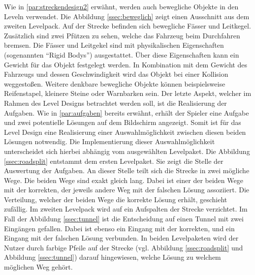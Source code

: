 		Wie in \ref{par:streckendesign2} erwähnt, werden auch bewegliche Objekte in den Leveln verwendet. Die Abbildung \ref{ssec:beweglich} zeigt einen Ausschnitt aus dem zweiten Levelpack. Auf der Strecke befinden sich bewegliche Fässer und Leitkegel. Zusätzlich sind zwei Pfützen zu sehen, welche das Fahrzeug beim Durchfahren bremsen. Die Fässer und Leitgekel sind mit physikalischen Eigenschaften (sogenannten \enquote{Rigid Bodys}) ausgestattet. Über diese Eigenschaften kann ein Gewicht für das Objekt festgelegt werden. In Kombination mit dem Gewicht des Fahrzeugs und dessen Geschwindigkeit wird das Objekt bei einer Kollision weggestoßen. Weitere denkbare bewegliche Objekte können beispielsweise Reifenstapel, kleinere Steine oder Warnbarken sein.
		Der letzte Aspekt, welcher im Rahmen des Level Designs betrachtet werden soll, ist die Realisierung der Aufgaben. Wie in \ref{par:aufgaben} bereits erwähnt, erhält der Spieler eine Aufgabe und zwei potentielle Lösungen auf dem Bildschirm angezeigt. Somit ist für das Level Design eine Realisierung einer Auswahlmöglichkeit zwischen diesen beiden Lösungen notwendig. Die Implementierung dieser Auswahlmöglichkeit unterscheidet sich hierbei abhängig vom ausgewählten Levelpaket.
		Die Abbildung \ref{ssec:roadsplit} entstammt dem ersten Levelpaket. Sie zeigt die Stelle der Auswertung der Aufgaben. An dieser Stelle teilt sich die Strecke in zwei mögliche Wege. Die beiden Wege sind exakt gleich lang. Dabei ist einer der beiden Wege mit der korrekten, der jeweils andere Weg mit der falschen Lösung assoziiert. Die Verteilung, welcher der beiden Wege die korrekte Lösung erhält, geschieht zufällig.
		Im zweiten Levelpack wird auf ein Aufspalten der Strecke verzichtet. Im Fall der Abbildung \ref{ssec:tunnel} ist die Entscheidung auf einen Tunnel mit zwei Eingängen gefallen. Dabei ist ebenso ein Eingang mit der korrekten, und ein Eingang mit der falschen Lösung verbunden. In beiden Levelpaketen wird der Nutzer durch farbige Pfeile auf der Strecke (vgl. Abbildung \ref{ssec:roadsplit} und Abbildung \ref{ssec:tunnel}) darauf hingewiesen, welche Lösung zu welchem möglichen Weg gehört.

